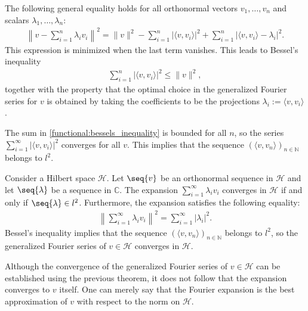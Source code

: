     \begin{property}
        The following general equality holds for all orthonormal vectors $v_1,\ldots,v_n$ and scalars $\lambda_1,\ldots,\lambda_n$:
        \begin{gather}
            \left\|v - \sum_{i=1}^n\lambda_iv_i\right\|^2 = \|v\|^2 - \sum_{i=1}^n|\langle v,v_i \rangle|^2 + \sum_{i=1}^n|\langle v,v_i \rangle - \lambda_i|^2.
        \end{gather}
        This expression is minimized when the last term vanishes. This leads to Bessel's inequality
        \begin{gather}
            \label{functional:bessels_inequality}
            \sum_{i=1}^n|\langle v,v_i \rangle|^2\leq\|v\|^2,
        \end{gather}
        together with the property that the optimal choice in the generalized Fourier series for $v$ is obtained by taking the coefficients to be the projections $\lambda_i:=\langle v,v_i \rangle$.
    \end{property}
    \begin{result}
        The sum in \eqref{functional:bessels_inequality} is bounded for all $n$, so the series $\sum_{i=1}^\infty|\langle v,v_i \rangle|^2$ converges for all $v$. This implies that the sequence $(\langle v,v_n\rangle)_{n\in\mathbb{N}}$ belongs to $l^2$.
    \end{result}

    \begin{theorem}
        Consider a Hilbert space $\mathcal{H}$. Let $\seq{v}$ be an orthonormal sequence in $\mathcal{H}$ and let $\seq{\lambda}$ be a sequence in $\mathbb{C}$. The expansion $\sum_{i=1}^\infty\lambda_iv_i$ converges in $\mathcal{H}$ if and only if $\seq{\lambda}\in l^2$. Furthermore, the expansion satisfies the following equality:
        \begin{gather}
            \left\|\sum_{i=1}^\infty\lambda_iv_i\right\|^2 = \sum_{i=1}^\infty|\lambda_i|^2.
        \end{gather}
        Bessel's inequality implies that the sequence $(\langle v,v_n \rangle)_{n\in\mathbb{N}}$ belongs to $l^2$, so the generalized Fourier series of $v\in\mathcal{H}$ converges in $\mathcal{H}$.
    \end{theorem}
    \begin{remark}
        Although the convergence of the generalized Fourier series of $v\in\mathcal{H}$ can be established using the previous theorem, it does not follow that the expansion converges to $v$ itself. One can merely say that the Fourier expansion is the best approximation of $v$ with respect to the norm on $\mathcal{H}$.
    \end{remark}

